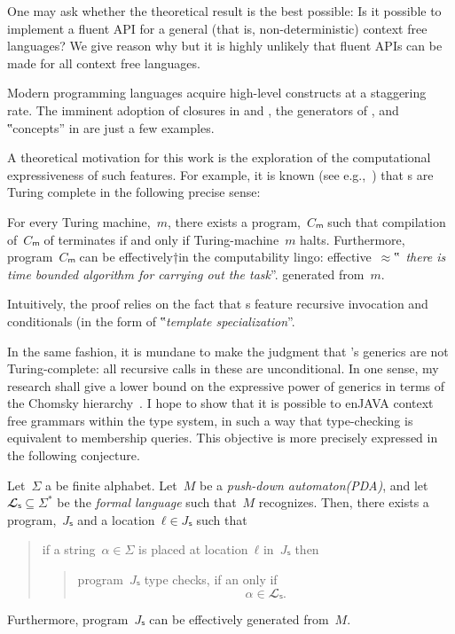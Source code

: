 One may ask whether the theoretical result is the 
  best possible: 
Is it possible to implement a fluent API for a general
  (that is, non-deterministic) context free languages?
We give reason why but it is highly unlikely that 
  fluent APIs can be made for all context free languages.

Modern programming languages acquire high-level constructs
  at a staggering rate.
The imminent adoption of closures in \Java and \CC,
  the generators of \CSharp, and ‟concepts” in
  \CC are just a few examples.

A theoretical motivation for this work
  is the exploration of the computational
  expressiveness of such features.
For example, it is known (see e.g.,~\cite{Gutterman:2003}) that
  s are Turing complete in the following precise sense:

\begin{Theorem}
  \label{Theorem:Gutterman}
  For every Turing machine,~$m$, there exists a \CC program,~$Cₘ$ such that
    compilation of~$Cₘ$ of terminates if and only if
      Turing-machine~$m$ halts.
  Furthermore, program~$Cₘ$ can be effectively†{in the computability lingo:
    effective~$≈$‟~\emph{there is time
  bounded algorithm for carrying out the task}”.} generated from~$m$.
\end{Theorem}

Intuitively, the proof relies on the fact that s
  feature recursive invocation and conditionals (in the form of
  ‟\emph{template specialization}”.

In the same fashion, it is mundane to make the judgment that
  \Java's generics are not Turing-complete: all recursive calls
  in these are unconditional.
In one sense, my research shall give a lower bound on the
  expressive power of \Java generics in terms of the Chomsky hierarchy~\cite{Chomsky:1963}.
I hope to show that it is possible to enJAVA context free grammars within the \Java type system,
  in such a way that type-checking is equivalent to membership queries.
This objective is more precisely expressed in the following conjecture.

\begin{Theorem}
\label{Theorem:Gil-Levy}
Let~$Σ$ a be finite alphabet.
Let~$M$ be a \emph{push-down automaton(PDA)}, and let~$𝓛ₛ⊆Σ^*$ be
the \emph{formal language} such that~$M$ recognizes.
Then, there exists a \Java program,~$Jₛ$ and a location~$ℓ∈Jₛ$
such that
\begin{quote}
  if a string~$α∈Σ$ is
  placed at location~$ℓ$ in~$Jₛ$ then
  \begin{quote}
    program~$Jₛ$ type checks, if an only if
    \[
      α∈𝓛ₛ.
    \]
  \end{quote}
\end{quote}
Furthermore, program~$Jₛ$ can be effectively generated from~$M$.
\end{Theorem}

